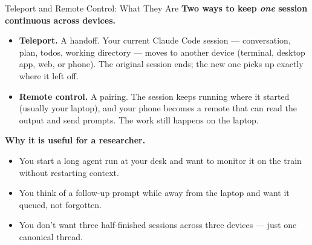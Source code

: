 \documentclass[aspectratio=169, 11pt]{beamer}
\begin{document}
\begin{frame}{Teleport and Remote Control: What They Are}
  \textbf{Two ways to keep \emph{one} session continuous across devices.}

  \vspace{0.7em}
  \begin{itemize}
    \item \textbf{Teleport.} A handoff. Your current Claude Code session --- conversation, plan, todos, working directory --- moves to another device (terminal, desktop app, web, or phone). The original session ends; the new one picks up exactly where it left off.

    \vspace{0.4em}
    \item \textbf{Remote control.} A pairing. The session keeps running where it started (usually your laptop), and your phone becomes a remote that can read the output and send prompts. The work still happens on the laptop.
  \end{itemize}

  \vspace{0.7em}
  \textbf{Why it is useful for a researcher.}
  \begin{itemize}\small
    \item You start a long agent run at your desk and want to monitor it on the train without restarting context.
    \item You think of a follow-up prompt while away from the laptop and want it queued, not forgotten.
    \item You don't want three half-finished sessions across three devices --- just one canonical thread.
  \end{itemize}
\end{frame}

\end{document}
